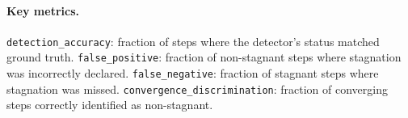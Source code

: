 \paragraph{Key metrics.}
\texttt{detection\_accuracy}: fraction of steps where the detector's
status matched ground truth.  \texttt{false\_positive}: fraction of
non-stagnant steps where stagnation was incorrectly declared.
\texttt{false\_negative}: fraction of stagnant steps where stagnation
was missed.  \texttt{convergence\_discrimination}: fraction of
converging steps correctly identified as non-stagnant.
